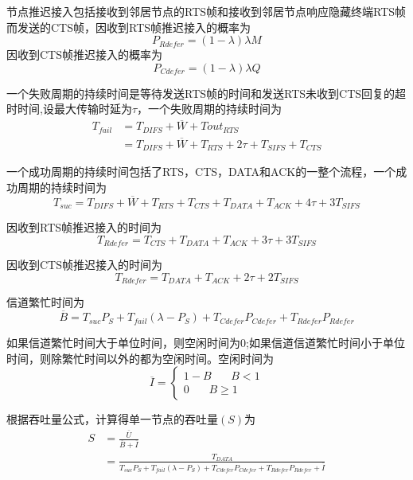 节点推迟接入包括接收到邻居节点的RTS帧和接收到邻居节点响应隐藏终端RTS帧而发送的CTS帧，因收到RTS帧推迟接入的概率为
\begin{equation}
 P_{Rdefer}=(1-\lambda)\lambda M
\end{equation}
因收到CTS帧推迟接入的概率为
\begin{equation}
 P_{Cdefer}=(1-\lambda)\lambda Q
\end{equation}

一个失败周期的持续时间是等待发送RTS帧的时间和发送RTS未收到CTS回复的超时时间,设最大传输时延为$\tau$，一个失败周期的持续时间为
\begin{equation}
\begin{aligned}
T_{fail}&=T_{DIFS}+\overline W+Tout_{RTS}\\
&=T_{DIFS}+\overline W+T_{RTS}+2\tau+T_{SIFS}+T_{CTS}
\end{aligned}
\end{equation}

一个成功周期的持续时间包括了RTS，CTS，DATA和ACK的一整个流程，一个成功周期的持续时间为
\begin{equation}
T_{suc}=T_{DIFS}+\overline W+T_{RTS}+T_{CTS}+T_{DATA}+T_{ACK}+4\tau+3T_{SIFS}
\end{equation}

因收到RTS帧推迟接入的时间为
\begin{equation}
T_{Rdefer}=T_{CTS}+T_{DATA}+T_{ACK}+3\tau+3T_{SIFS}
\end{equation}

因收到CTS帧推迟接入的时间为
\begin{equation}
T_{Rdefer}=T_{DATA}+T_{ACK}+2\tau+2T_{SIFS}
\end{equation}

信道繁忙时间为
\begin{equation}
\overline B=T_{suc}P_S+T_{fail}(\lambda-P_S )+ T_{Cdefer}P_{Cdefer}+T_{Rdefer}P_{Rdefer}
\end{equation}

如果信道繁忙时间大于单位时间，则空闲时间为0;如果信道信道繁忙时间小于单位时间，则除繁忙时间以外的都为空闲时间。空闲时间为
\begin{equation}
\overline I=\left\{
\begin{aligned}
1-B \ \ \ \ \ \ \ \ B<1\\
0\ \ \ \ \ \ \ \    B\ge 1
\end{aligned}
\right.
\end{equation}

根据吞吐量公式，计算得单一节点的吞吐量$(S)$为
\begin{equation}
\begin{aligned}
S&=\frac{\overline U}{\overline B+\overline I}\\&=\frac{T_{DATA}}{ T_{suc}P_S+T_{fail}(\lambda-P_S )+ T_{Cdefer}P_{Cdefer}+T_{Rdefer}P_{Rdefer}+\overline I}
\end{aligned}
\end{equation}

